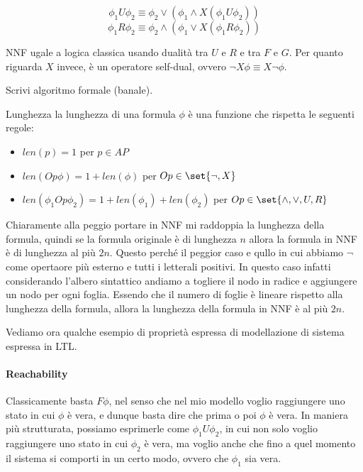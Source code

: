 \[\phi_1 U \phi_2 \equiv \phi_2 \lor (\phi_1 \land X(\phi_1 U \phi_2 ))\]
\[\phi_1 R \phi_2 \equiv \phi_2 \land (\phi_1 \lor X(\phi_1 R \phi_2 ))\]

NNF ugale a logica classica usando dualità tra \(U\) e \(R\) e tra \(F\) e \(G\). Per quanto riguarda \(X\) invece, è un operatore self-dual, ovvero \(\neg X \phi \equiv X \neg \phi\).

Scrivi algoritmo formale (banale).

\begin{definition}{Lunghezza}
  la lunghezza di una formula \(\phi\) è una funzione che rispetta le seguenti regole:
  \begin{itemize}
    \item \(len(p) = 1\) per \(p \in AP\)
    \item \(len(Op \phi) = 1 + len(\phi)\) per \(Op \in \set{\neg,X}\)
    \item \(len(\phi_1 Op \phi_2) = 1 + len(\phi_1) + len(\phi_2)\) per \(Op \in \set{\land, \lor, U, R}\)
  \end{itemize}
\end{definition}

Chiaramente alla peggio portare in NNF mi raddoppia la lunghezza della formula, quindi se la formula originale è di lunghezza \(n\) allora la formula in NNF è di lunghezza al più \(2n\). Questo perché il peggior caso e qullo in cui abbiamo \(\neg\) come opertaore più esterno e tutti i letterali positivi. In questo caso infatti considerando l'albero sintattico andiamo a togliere il nodo in radice e aggiungere un nodo per ogni foglia. Essendo che il numero di foglie è lineare rispetto alla lunghezza della formula, allora la lunghezza della formula in NNF è al più \(2n\).

Vediamo ora qualche esempio di proprietà espressa di modellazione di sistema espressa in LTL\@.

\paragraph{Reachability}

Classicamente basta \(F\phi\), nel senso che nel mio modello voglio raggiungere uno stato in cui \(\phi\) è vera, e dunque basta dire che prima o poi \(\phi\) è vera. In maniera più strutturata, possiamo esprimerle come \(\phi_1 U \phi_2\), in cui non solo voglio raggiungere uno stato in cui \(\phi_2\) è vera, ma voglio anche che fino a quel momento il sistema si comporti in un certo modo, ovvero che \(\phi_1\) sia vera.

